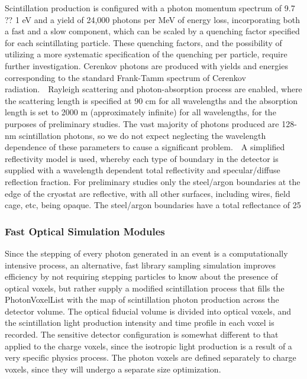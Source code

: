 \documentclass[12pt]{elsarticle}
\begin{document}
Scintillation production is configured with a photon momentum spectrum of 9.7 ?? 1 eV and a yield of 24,000 photons per MeV of energy loss, incorporating both a fast and a slow component, which can be scaled by a quenching factor specified for each scintillating particle.  These quenching factors, and the possibility of utilizing a more systematic specification of the quenching per particle, require further investigation. Cerenkov photons are produced with yields and energies corresponding to the standard Frank-Tamm spectrum of Cerenkov radiation.\
\
Rayleigh scattering and photon-absorption process are enabled, where the scattering length is specified at 90 cm for all wavelengths and the absorption length is set to 2000 m (approximately infinite) for all wavelengths, for the purposes of preliminary studies.  The vast majority of photons produced are 128-nm scintillation photons, so we do not expect neglecting the wavelength dependence of these parameters to cause a significant problem.\
\
A simplified reflectivity model is used, whereby each type of boundary in the detector is supplied with a wavelength dependent total reflectivity and specular/diffuse reflection fraction.   For  preliminary  studies  only the  steel/argon boundaries  at  the  edge of the cryostat are  reflective,  with  all  other  surfaces,  including  wires,  field cage,  etc,  being opaque.   The steel/argon boundaries have a total reflectance of 25%

\subsubsection{Fast Optical Simulation Modules}

Since the stepping of every photon generated in an event is a computationally intensive process, an alternative, fast library sampling simulation improves efficiency by not requiring stepping particles to know about the presence of optical voxels, but rather supply a modified scintillation process that fills the PhotonVoxelList with the map of scintillation photon production across the detector volume. 
The optical fiducial volume is divided into optical voxels, and the scintillation light production intensity and time profile in each voxel is recorded.  The sensitive detector configuration is somewhat different to that applied to the charge voxels, since the isotropic light production is a result of a very specific physics process.  The photon voxels are defined separately to charge voxels, since they will undergo a separate size optimization.
\end{document}
